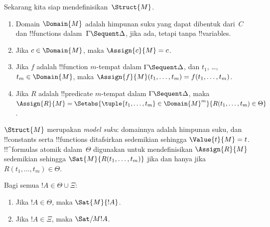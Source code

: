 \documentclass[../../../include/open-logic-section]{subfiles}
\begin{document}
Sekarang kita siap mendefinisikan~$\Struct{M}$.
\begin{enumerate}
\item Domain $\Domain{M}$ adalah himpunan suku yang dapat dibentuk dari~$C$
dan !!{function}s dalam~$\Gamma \Sequent \Delta$, jika ada, tetapi tanpa
!!{variable}s.
\item Jika $c \in \Domain{M}$, maka $\Assign{c}{M} = c$.
\item Jika $f$ adalah !!{function} $m$-tempat dalam
$\Gamma \Sequent \Delta$, dan $t_1$, \dots, $t_m \in \Domain{M}$, maka
$\Assign{f}{M}(t_1, \dots, t_m) = f(t_1, \dots, t_m)$.
\item Jika $R$ adalah !!{predicate} $m$-tempat dalam
$\Gamma \Sequent \Delta$, maka
$\Assign{R}{M} = \Setabs{\tuple{t_1, \dots, t_m} \in
\Domain{M}^m}{R(t_1, \dots, t_m) \in \Theta}$.
\end{enumerate}
$\Struct{M}$ merupakan \emph{model suku}: domainnya adalah himpunan suku,
dan !!{constant}s serta !!{function}s ditafsirkan sedemikian sehingga
$\Value{t}{M} = t$. !!^{formula}s atomik dalam~$\Theta$ digunakan untuk
mendefinisikan $\Assign{R}{M}$ sedemikian sehingga
$\Sat{M}{R(t_1, \dots, t_m)}$ jika dan hanya jika
$R(t_1, \dots, t_m) \in \Theta$.

\begin{lem}
Bagi semua $!A \in \Theta \cup \Xi$:
\begin{enumerate}
  \item Jika $!A \in \Theta$, maka $\Sat{M}{!A}$.
  \item Jika $!A \in \Xi$, maka $\Sat/{M}{!A}$.
\end{enumerate}
\end{lem}
\end{document}
